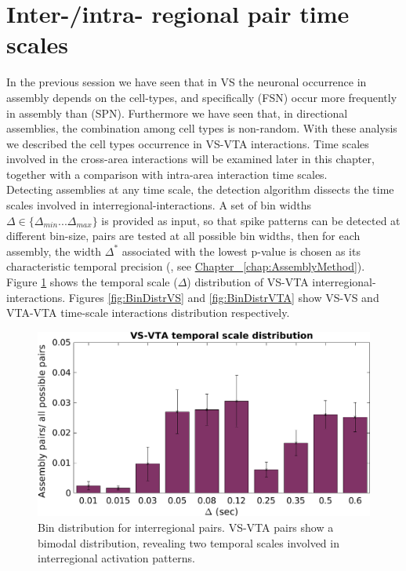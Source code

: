 \section{Inter-/intra- regional pair time scales}
\label{sec:TimeScales}
In the previous session we have seen that in VS the neuronal occurrence in assembly depends on the cell-types, and specifically (FSN) occur more frequently in assembly than (SPN). Furthermore we have seen that, in directional assemblies, the combination among cell types is non-random. With these analysis we described the cell types occurrence in VS-VTA interactions. Time scales involved in the cross-area interactions will be examined later in this chapter, together with a comparison with intra-area interaction time scales.\\
Detecting assemblies at any time scale, the detection algorithm dissects the time scales involved in interregional-interactions. A set of bin widths $\Delta \in \{\Delta_{min}...\Delta_{max}\}$ is provided as input, so that spike patterns can be detected at different bin-size, pairs are tested at all possible bin widths, then for each assembly, the width $\Delta^*$ associated with the lowest p-value is chosen as its characteristic temporal precision (\cite{RussoDurstewitz}, see \hyperref[chap:AssemblyMethod]{Chapter~ \ref*{chap:AssemblyMethod}}).\\
Figure \ref{fig:BinDistr} shows the temporal scale ($\Delta$) distribution of VS-VTA interregional-interactions. Figures \ref{fig:BinDistrVS} and \ref{fig:BinDistrVTA} show VS-VS and VTA-VTA time-scale interactions distribution respectively.
\begin{figure}[H]
\centering
\includegraphics[scale=0.46]{figures/VS_VTA_Short1.png}
\caption{Bin distribution for interregional pairs. VS-VTA pairs show a bimodal distribution, revealing two temporal scales involved in interregional activation patterns.}
\label{fig:BinDistr}
\end{figure}
